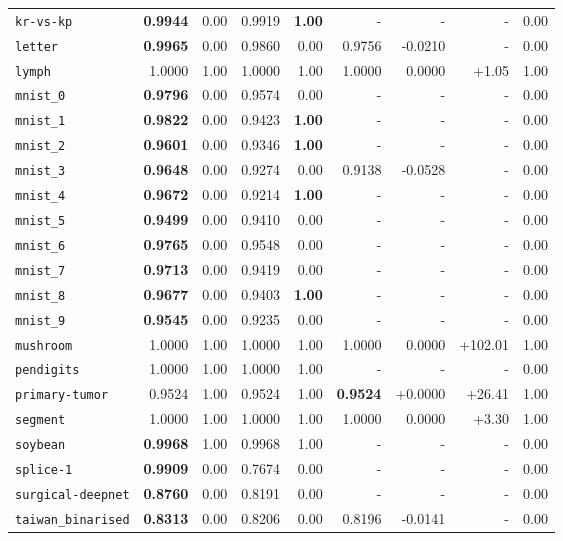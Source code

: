 \begin{tabular}{lrrrrrrrr}
\texttt{kr-vs-kp} & \textbf{0.9944} & 0.00 & 0.9919 & \textbf{1.00} & - & - & - & 0.00\\
\texttt{letter} & \textbf{0.9965} & 0.00 & 0.9860 & 0.00 & 0.9756 & -0.0210 & - & 0.00\\
\texttt{lymph} & 1.0000 & 1.00 & 1.0000 & 1.00 & 1.0000 & 0.0000 & +1.05 & 1.00\\
\texttt{mnist\_0} & \textbf{0.9796} & 0.00 & 0.9574 & 0.00 & - & - & - & 0.00\\
\texttt{mnist\_1} & \textbf{0.9822} & 0.00 & 0.9423 & \textbf{1.00} & - & - & - & 0.00\\
\texttt{mnist\_2} & \textbf{0.9601} & 0.00 & 0.9346 & \textbf{1.00} & - & - & - & 0.00\\
\texttt{mnist\_3} & \textbf{0.9648} & 0.00 & 0.9274 & 0.00 & 0.9138 & -0.0528 & - & 0.00\\
\texttt{mnist\_4} & \textbf{0.9672} & 0.00 & 0.9214 & \textbf{1.00} & - & - & - & 0.00\\
\texttt{mnist\_5} & \textbf{0.9499} & 0.00 & 0.9410 & 0.00 & - & - & - & 0.00\\
\texttt{mnist\_6} & \textbf{0.9765} & 0.00 & 0.9548 & 0.00 & - & - & - & 0.00\\
\texttt{mnist\_7} & \textbf{0.9713} & 0.00 & 0.9419 & 0.00 & - & - & - & 0.00\\
\texttt{mnist\_8} & \textbf{0.9677} & 0.00 & 0.9403 & \textbf{1.00} & - & - & - & 0.00\\
\texttt{mnist\_9} & \textbf{0.9545} & 0.00 & 0.9235 & 0.00 & - & - & - & 0.00\\
\texttt{mushroom} & 1.0000 & 1.00 & 1.0000 & 1.00 & 1.0000 & 0.0000 & +102.01 & 1.00\\
\texttt{pendigits} & 1.0000 & 1.00 & 1.0000 & 1.00 & - & - & - & 0.00\\
\texttt{primary-tumor} & 0.9524 & 1.00 & 0.9524 & 1.00 & \textbf{0.9524} & +0.0000 & +26.41 & 1.00\\
\texttt{segment} & 1.0000 & 1.00 & 1.0000 & 1.00 & 1.0000 & 0.0000 & +3.30 & 1.00\\
\texttt{soybean} & \textbf{0.9968} & 1.00 & 0.9968 & 1.00 & - & - & - & 0.00\\
\texttt{splice-1} & \textbf{0.9909} & 0.00 & 0.7674 & 0.00 & - & - & - & 0.00\\
\texttt{surgical-deepnet} & \textbf{0.8760} & 0.00 & 0.8191 & 0.00 & - & - & - & 0.00\\
\texttt{taiwan\_binarised} & \textbf{0.8313} & 0.00 & 0.8206 & 0.00 & 0.8196 & -0.0141 & - & 0.00\\

\end{tabular}
